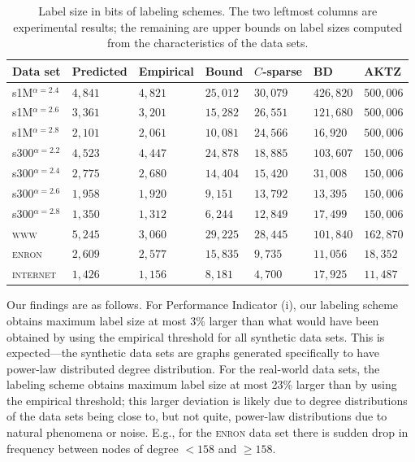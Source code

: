 \begin{table}[!ht]
\centering
\small
\begin{tabular}{l|llllll}
Data set             &Predicted & Empirical & Bound     &  $C$-sparse & BD \cite{adjiashvili2014labeling} & AKTZ \cite{alstrup2014adjacency} \\\hline
s1M$^{\alpha=2.4}$  &$4,841$    &$4,821$    & $25,012 $ &$30,079$     &$426,820$ &$500,006$\\\hline
s1M$^{\alpha=2.6}$  &$3,361$    &$3,201$    & $15,282 $ &$26,551$     &$121,680$ &$500,006$\\\hline
s1M$^{\alpha=2.8}$  &$2,101$    &$2,061$    & $10,081 $ &$24,566$     &$16,920$  &$500,006$\\\hline
s300$^{\alpha=2.2}$ &$4,523$    &$4,447$    & $24,878 $ &$18,885$     &$103,607$ &$150,006$\\\hline
s300$^{\alpha=2.4}$ &$2,775$    &$2,680$    & $14,404 $ &$15,420$     &$31,008$  &$150,006$\\\hline
s300$^{\alpha=2.6}$ &$1,958$    &$1,920$    & $9,151 $  &$13,792$     &$13,395$  &$150,006$\\\hline
s300$^{\alpha=2.8}$ &$1,350$    &$1,312$    & $6,244 $  &$12,849$     &$17,499$  &$150,006$\\\hline
\textsc{www}        &$5,245$    &$3,060$    & $29,225 $ &$28,445$     &$101,840$ &$162,870$ \\\hline
\textsc{enron}      &$2,609$    &$2,577$    & $15,835 $ &$9,735$      &$11,056$  &$18,352$\\\hline
\textsc{internet}   &$1,426$    &$1,156$    & $8,181 $  &$4,700$      &$17,925$  &$11,487$\\\hline 
\end{tabular}
\caption{Label size in bits of labeling schemes. The two leftmost columns are experimental results; the remaining are upper bounds on label sizes computed from the characteristics of the data sets.}
\label{t:labelsizes}
\end{table}

Our findings are as follows. For Performance Indicator (i), our labeling scheme obtains maximum label size at most 3\% larger than what would have been obtained by using the empirical threshold for all synthetic data sets.
This is expected---the synthetic data sets are graphs generated specifically to have power-law distributed degree distribution. For the real-world data sets, the labeling scheme
obtains maximum label size at most 23\% larger than by using the empirical threshold; this larger deviation is likely due to degree distributions of the data sets being close to, but not quite,
power-law distributions due to natural phenomena or noise. E.g., for the \textsc{enron} data set there is sudden drop in frequency between nodes of degree $< 158$ and $\geq 158$.

